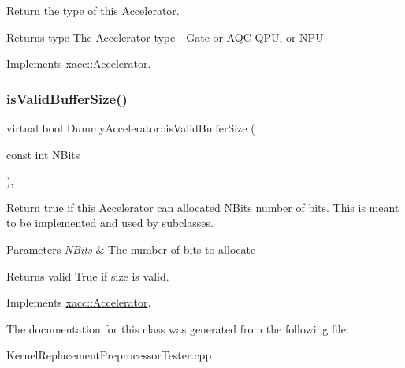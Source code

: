 Return the type of this Accelerator.

\begin{DoxyReturn}{Returns}
type The Accelerator type -\/ Gate or A\+QC Q\+PU, or N\+PU 
\end{DoxyReturn}


Implements \hyperlink{a01435_aaffc3e4bb9880eb5041b1b58ee4c2665}{xacc\+::\+Accelerator}.

\mbox{\label{a01143_a831ad0c71864920cc49a00d29768af8c}} 
\subsubsection{\texorpdfstring{is\+Valid\+Buffer\+Size()}{isValidBufferSize()}}
{\footnotesize\ttfamily virtual bool Dummy\+Accelerator\+::is\+Valid\+Buffer\+Size (\begin{DoxyParamCaption}\item[{const int}]{N\+Bits }\end{DoxyParamCaption})\hspace{0.3cm}{\ttfamily [inline]}, {\ttfamily [virtual]}}

Return true if this Accelerator can allocated N\+Bits number of bits. This is meant to be implemented and used by subclasses.


\begin{DoxyParams}{Parameters}
{\em N\+Bits} & The number of bits to allocate \\
\hline
\end{DoxyParams}
\begin{DoxyReturn}{Returns}
valid True if size is valid. 
\end{DoxyReturn}


Implements \hyperlink{a01435_ae51584850faeec77299058383977ddeb}{xacc\+::\+Accelerator}.



The documentation for this class was generated from the following file\+:\begin{DoxyCompactItemize}
\item 
Kernel\+Replacement\+Preprocessor\+Tester.\+cpp\end{DoxyCompactItemize}
